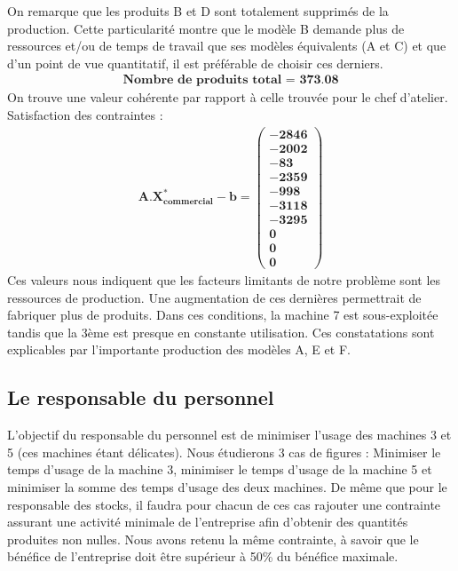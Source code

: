 \documentclass[12pt]{article}
\begin{document}
On remarque que les produits B et D sont totalement supprimés de la production. Cette particularité montre que le modèle B demande plus de ressources et/ou de temps de travail que ses modèles équivalents (A et C) et que d'un point de vue quantitatif, il est préférable de choisir ces derniers. 
\begin{align*}
\textbf{Nombre de produits total = 373.08}
\end{align*}
On trouve une valeur cohérente par rapport à celle trouvée pour le chef d'atelier.\\
Satisfaction des contraintes : 
\begin{align*}
\boldsymbol{A.X^{*}_{commercial} - b = 
   \left (
   \begin{aligned}
      -2846 \\
      -2002 \\
      -83 \\
      -2359 \\
      -998 \\
      -3118 \\
      -3295 \\
      0 \\
      0 \\
      0
   \end{aligned}
   \right )
 } 
\end{align*}
Ces valeurs nous indiquent que les facteurs limitants de notre problème sont les ressources de production. Une augmentation de ces dernières permettrait de fabriquer plus de produits.
Dans ces conditions, la machine 7 est sous-exploitée tandis que la 3ème est presque en constante utilisation. Ces constatations sont explicables par l'importante production des modèles A, E et F. 
\subsection{Le responsable du personnel}
L'objectif du responsable du personnel est de minimiser l'usage des machines 3 et 5 (ces machines étant délicates).
Nous étudierons 3 cas de figures : Minimiser le temps d'usage de la machine 3, minimiser le temps d'usage de la machine 5 et minimiser la somme des temps d'usage des deux machines.
De même que pour le responsable des stocks, il faudra pour chacun de ces cas rajouter une contrainte assurant une  activité minimale de l'entreprise afin d'obtenir des quantités produites non nulles. Nous avons retenu la même contrainte, à savoir que le bénéfice de l'entreprise doit être supérieur à 50\% du bénéfice maximale.
\end{document}
